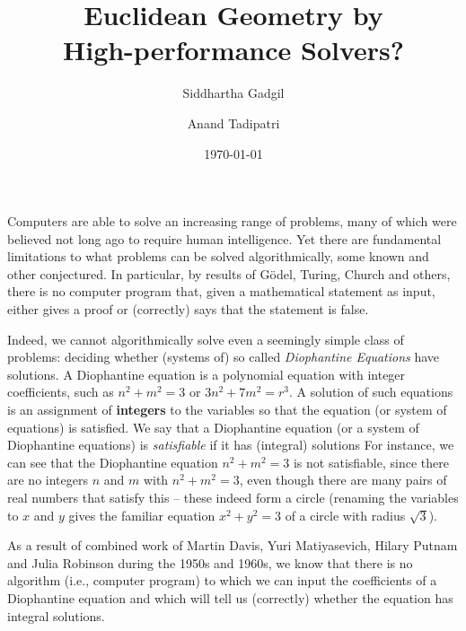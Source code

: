 \documentclass{amsart}
\theoremstyle{plain}
\theoremstyle{definition}
\theoremstyle{remark}
\begin{document}
\title[Euclidean Geometry by High-performance Solvers?]{Euclidean Geometry by\\ High-performance Solvers?}
\date{\today}
\author{Siddhartha Gadgil}

\address{Department of Mathematics\\
	Indian Institute of Science\\
	Bangalore.}

\author{Anand Tadipatri}
\address{Indian Institute of Science Education and Research\\
	Pune.}

\maketitle

Computers are able to solve an increasing range of problems, many of
which were believed not long ago to require human intelligence. Yet
there are fundamental limitations to what problems can be solved
algorithmically, some known and other conjectured. In particular, by
results of G\"odel, Turing, Church and others, there is no computer
program that, given a mathematical statement as input, either gives a
proof or (correctly) says that the statement is false.

Indeed, we cannot algorithmically solve even a seemingly simple class of
problems: deciding whether (systems of) so called
\emph{Diophantine Equations} have solutions. A Diophantine equation is a polynomial
equation with integer coefficients, such as $n^2 + m^2 = 3$ or \(3n^2 + 7m^2 = r^3\).
A solution of such equations is an assignment of \textbf{integers} to the variables so that
the equation (or system of equations) is satisfied.
We say that a Diophantine equation (or a system of Diophantine equations) is \emph{satisfiable}
if it has (integral) solutions
For
instance, we can see that the Diophantine equation \(n^2 + m^2 = 3\) is not satisfiable,
since there are no integers $n$ and $m$ with \(n^2 + m^2 = 3\), even though there
are many pairs of real numbers that satisfy this -- these indeed form a circle (renaming the variables
to $x$ and $y$ gives the familiar equation $x^2+ y^2 =3$ of a circle with radius $\sqrt{3}$).

As a result of combined work of Martin Davis, Yuri Matiyasevich, Hilary
Putnam and Julia Robinson during the 1950s and 1960s, we know that there
is no algorithm (i.e., computer program) to which we can input the
coefficients of a Diophantine equation and which will tell us
(correctly) whether the equation has integral solutions.
\end{document}
